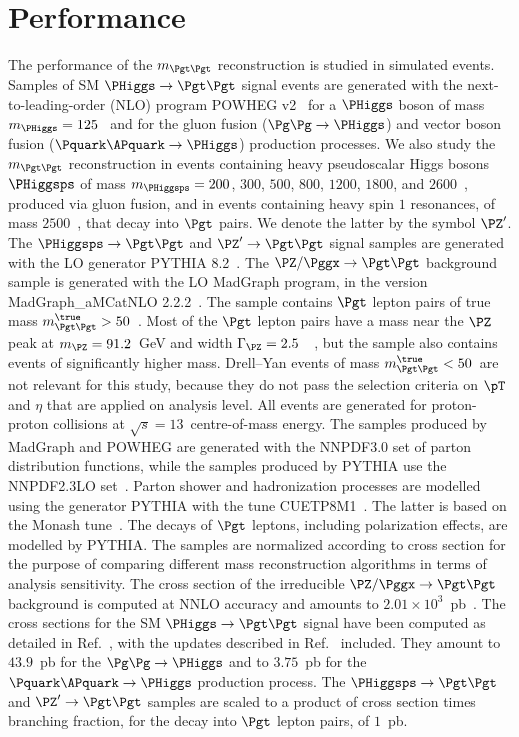 \section{Performance}
\label{sec:performance}

The performance of the $m_{\Pgt\Pgt}$ reconstruction is studied in simulated events.
Samples of SM $\PHiggs \to \Pgt\Pgt$ signal events
are generated with the next-to-leading-order (NLO) program POWHEG v2~\cite{POWHEG1,POWHEG2,POWHEG3}
for a $\PHiggs$ boson of mass $m_{\PHiggs} = 125$~\GeV 
and for the gluon fusion ($\Pg\Pg \to \PHiggs$) and vector boson fusion ($\Pquark\APquark \to \PHiggs$) production processes.
We also study the $m_{\Pgt\Pgt}$ reconstruction in events containing
heavy pseudoscalar Higgs bosons $\PHiggsps$ of mass $m_{\PHiggsps} = 200$, $300$, $500$, $800$, $1200$, $1800$, and $2600$~\GeV,
produced via gluon fusion, and in events containing heavy spin $1$
resonances, of mass $2500$~\GeV, that decay into $\Pgt$ pairs.
We denote the latter by the symbol $\PZ'$. 
The $\PHiggsps \to \Pgt\Pgt$ and $\PZ' \to \Pgt\Pgt$ signal samples are generated with the LO generator PYTHIA 8.2~\cite{pythia8}.
The $\PZ/\Pggx \to \Pgt\Pgt$ background sample is generated with the LO MadGraph program, in the version MadGraph\_aMCatNLO 2.2.2~\cite{MadGraph_aMCatNLO}.
The sample contains $\Pgt$ lepton pairs of true mass $m_{\Pgt\Pgt}^{\true} > 50$~\GeV.
Most of the $\Pgt$ lepton pairs have a mass near the $\PZ$ peak at $m_{\PZ} = 91.2$~GeV and width $\Gamma_{\PZ} = 2.5$~\GeV~\cite{PDG}, 
but the sample also contains events of significantly higher mass.
Drell--Yan events of mass $m_{\Pgt\Pgt}^{\true} < 50$~\GeV are not relevant for this study, 
because they do not pass the selection criteria on $\pT$ and $\eta$ that are applied on analysis level.
All events are generated for proton-proton collisions at $\sqrt{s} = 13$~\TeV centre-of-mass energy.
The samples produced by MadGraph and POWHEG are generated with the NNPDF3.0 set of parton distribution functions,
while the samples produced by PYTHIA use the NNPDF2.3LO set~\cite{NNPDF1,NNPDF2,NNPDF3}.
Parton shower and hadronization processes are modelled using the generator PYTHIA with the tune CUETP8M1~\cite{PYTHIA_CUETP8M1tune_CMS}.
The latter is based on the Monash tune~\cite{PYTHIA_MonashTune}.
The decays of $\Pgt$ leptons, including polarization effects, are modelled by PYTHIA.
The samples are normalized according to cross section for the purpose of comparing different mass reconstruction algorithms in terms of analysis sensitivity.
The cross section of the irreducible $\PZ/\Pggx \to \Pgt\Pgt$ background is computed at NNLO accuracy and amounts to $2.01 \times 10^{3}$~pb~\cite{FEWZ}.
The cross sections for the SM $\PHiggs \to \Pgt\Pgt$ signal have been computed as detailed in Ref.~\cite{Dittmaier:2011ti},
with the updates described in Ref.~\cite{Heinemeyer:2013tqa} included.
They amount to $43.9$~pb for the $\Pg\Pg \to \PHiggs$ and to $3.75$~pb for the $\Pquark\APquark \to \PHiggs$ production process.
The $\PHiggsps \to \Pgt\Pgt$ and $\PZ' \to \Pgt\Pgt$ samples 
are scaled to a product of cross section times branching fraction, for the decay into $\Pgt$ lepton pairs, of $1$~pb.


